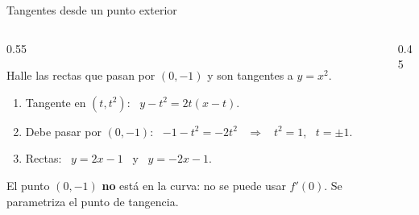 \documentclass[10pt,aspectratio=169]{beamer}
\begin{document}
\begin{frame}{Tangentes desde un punto exterior}
  \begin{columns}
    \begin{column}{0.55\textwidth}
      \begin{ejemplo}[8]
        Halle las rectas que pasan por $(0,-1)$ y son tangentes a $y=x^2$.
        \begin{enumerate}
          \item Tangente en $(t,t^2)$: \ $y-t^2=2t(x-t)$.
          \item Debe pasar por $(0,-1)$: \ $-1-t^2=-2t^2$ \ $\Rightarrow$ \ $t^2=1$, \ $t=\pm1$.
          \item Rectas: \ $y=2x-1$ \ y \ $y=-2x-1$.
        \end{enumerate}
      \end{ejemplo}
      \begin{observacion}
        El punto $(0,-1)$ \textbf{no} está en la curva: no se puede usar $f'(0)$. Se parametriza el punto de tangencia.
      \end{observacion}
    \end{column}
    \begin{column}{0.45\textwidth}
      \centering
    \end{column}
  \end{columns}
\end{frame}
\end{document}
